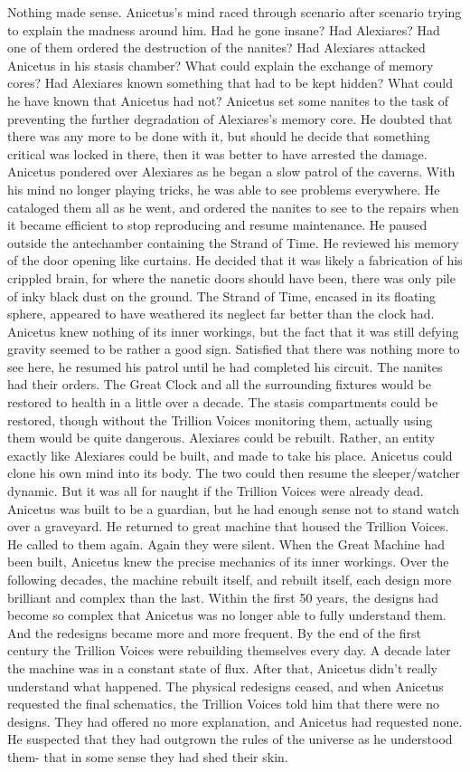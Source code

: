 \documentclass[a4paper]{article}
\begin{document}
Nothing made sense. Anicetus’s mind raced through scenario after scenario trying to explain the madness around him. Had he gone insane? Had Alexiares? Had one of them ordered the destruction of the nanites? Had Alexiares attacked Anicetus in his stasis chamber? What could explain the exchange of memory cores? Had Alexiares known something that had to be kept hidden? What could he have known that Anicetus had not?
Anicetus set some nanites to the task of preventing the further degradation of Alexiares’s memory core. He doubted that there was any more to be done with it, but should he decide that something critical was locked in there, then it was better to have arrested the damage.
Anicetus pondered over Alexiares as he began a slow patrol of the caverns. With his mind no longer playing tricks, he was able to see problems everywhere. He cataloged them all as he went, and ordered the nanites to see to the repairs when it became efficient to stop reproducing and resume maintenance.
He paused outside the antechamber containing the Strand of Time. He reviewed his memory of the door opening like curtains. He decided that it was likely a fabrication of his crippled brain, for where the nanetic doors should have been, there was only pile of inky black dust on the ground.
The Strand of Time, encased in its floating sphere, appeared to have weathered its neglect far better than the clock had. Anicetus knew nothing of its inner workings, but the fact that it was still defying gravity seemed to be rather a good sign. Satisfied that there was nothing more to see here, he resumed his patrol until he had completed his circuit.
The nanites had their orders. The Great Clock and all the surrounding fixtures would be restored to health in a little over a decade. The stasis compartments could be restored, though without the Trillion Voices monitoring them, actually using them would be quite dangerous.
Alexiares could be rebuilt. Rather, an entity exactly like Alexiares could be built, and made to take his place. Anicetus could clone his own mind into its body. The two could then resume the sleeper/watcher dynamic. But it was all for naught if the Trillion Voices were already dead. Anicetus was built to be a guardian, but he had enough sense not to stand watch over a graveyard.
He returned to great machine that housed the Trillion Voices. He called to them again. Again they were silent.
When the Great Machine had been built, Anicetus knew the precise mechanics of its inner workings. Over the following decades, the machine rebuilt itself, and rebuilt itself, each design more brilliant and complex than the last. Within the first 50 years, the designs had become so complex that Anicetus was no longer able to fully understand them. And the redesigns became more and more frequent. By the end of the first century the Trillion Voices were rebuilding themselves every day. A decade later the machine was in a constant state of flux. After that, Anicetus didn’t really understand what happened. The physical redesigns ceased, and when Anicetus requested the final schematics, the Trillion Voices told him that there were no designs. They had offered no more explanation, and Anicetus had requested none. He suspected that they had outgrown the rules of the universe as he understood them- that in some sense they had shed their skin.
\end{document}

